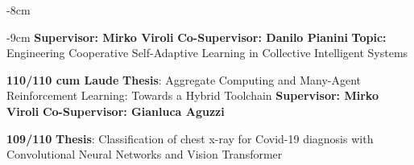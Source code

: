 \documentclass[10pt,a4paper]{altacv}
\begin{document}

    \begin{adjustwidth}{}{-8cm}
        \makecvheader
    \end{adjustwidth}

\begin{adjustwidth}{}{-9cm}
    \textbf{Supervisor: Mirko Viroli} \newline \textbf{Co-Supervisor: Danilo Pianini} \newline
    \textbf{Topic:} Engineering Cooperative Self-Adaptive Learning in Collective Intelligent Systems

    \divider

    \textbf{110/110 cum Laude} \newline
    \textbf{Thesis}: Aggregate Computing and Many-Agent Reinforcement Learning: Towards a Hybrid Toolchain \newline
    \textbf{Supervisor: Mirko Viroli} \newline \textbf{Co-Supervisor: Gianluca Aguzzi}

    \divider

    \textbf{109/110} \newline
    \textbf{Thesis}: Classification of chest x-ray for Covid-19 diagnosis with Convolutional Neural Networks and Vision Transformer\newline


    \divider


    \divider

\end{adjustwidth}
\end{document}
